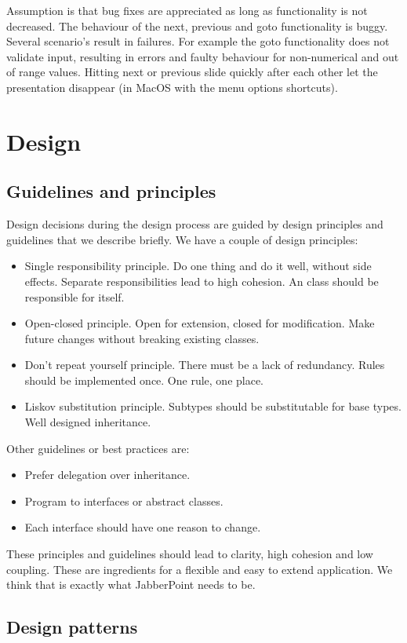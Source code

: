 \documentclass[a4paper]{article}
\begin{document}
Assumption is that bug fixes are appreciated as long as functionality is not decreased. The behaviour of the next, previous and goto functionality is buggy. Several scenario's result in failures. For example the goto functionality does not validate input, resulting in errors and faulty behaviour for non-numerical and out of range values. Hitting next or previous slide quickly after each other let the presentation disappear (in MacOS with the menu options shortcuts).   

\section{Design}
\subsection{Guidelines and principles} 
Design decisions during the design process are guided by design principles and guidelines that we describe briefly.
We have a couple of design principles:
\begin{itemize}
\item Single responsibility principle. Do one thing and do it well, without side effects. Separate responsibilities lead to high cohesion. An class should be responsible for itself.
\item Open-closed principle. Open for extension, closed for modification. Make future changes without breaking existing classes.
\item Don't repeat yourself principle. There must be a lack of redundancy. Rules should be implemented once. One rule, one place.
\item Liskov substitution principle. Subtypes should be substitutable for base types. Well designed inheritance. 
\end{itemize}

Other guidelines or best practices are:
\begin{itemize}
\item Prefer delegation over inheritance.
\item Program to interfaces or abstract classes.
\item Each interface should have one reason to change.
\end{itemize}
These principles and guidelines should lead to clarity, high cohesion and low coupling. These are ingredients for a flexible and easy to extend application. We think that is exactly what JabberPoint needs to be. 

\subsection{Design patterns}
\end{document}
